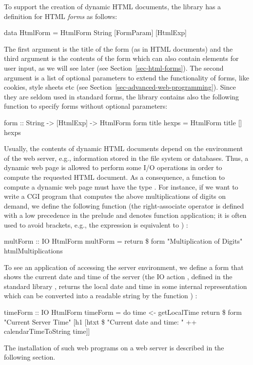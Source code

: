 To support the creation of dynamic HTML documents,
the library 
has a definition for HTML \emph{forms}
as follows:
\begin{prog}
data HtmlForm = HtmlForm String [FormParam] [HtmlExp] 
\end{prog}
The first argument is the title of the form (as in HTML documents)
and the third argument is the contents of the form
which can also contain elements for user input, as
we will see later (see Section~\ref{sec-html-forms}).
The second argument is a list of optional parameters
to extend the functionality of forms, like cookies,
style sheets etc (see Section~\ref{sec-advanced-web-programming}).
Since they are seldom used in standard forms,
the  library contains also the following function
to specify forms without optional parameters:
\begin{prog}
form :: String -> [HtmlExp] -> HtmlForm
form title hexps = HtmlForm title [] hexps
\end{prog}
%
Usually, the contents of dynamic HTML documents depend on the
environment of the web server, e.g., information stored in the
file system or databases. Thus, a dynamic web page is allowed to
perform some I/O operations in order to compute the requested
HTML document. As a consequence, a function to compute
a dynamic web page must have
the type . For instance, if we want to
write a CGI program that computes the above multiplications
of digits on demand, we define the following function 
(the right-associate operator \ccode{\$}\pindex{\$} is
defined with a low precedence
in the prelude and denotes function application; it is often used to avoid
brackets, e.g., the expression  is equivalent to
)
:
\begin{prog}
multForm :: IO HtmlForm
multForm = return \$ form "Multiplication of Digits" htmlMultiplications
\end{prog}
To see an application of accessing the server environment,
we define a form that shows the current date and time of the server
(the IO action ,
defined in the standard library , returns the local
date and time in some internal representation which can be
converted into a readable string by the function
)
:
\begin{prog}
timeForm :: IO HtmlForm
timeForm = do
 time <- getLocalTime
 return \$ form "Current Server Time"
          [h1 [htxt \$ "Current date and time: " ++ calendarTimeToString time]]
\end{prog}
%
The installation of such web programs on a web server is described
in the following section.

